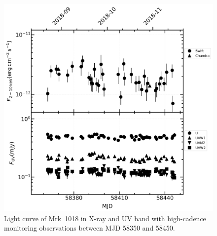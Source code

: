\documentclass[twocolumn]{aastex63}
\begin{document}

\begin{figure}
\centering
	\includegraphics[width=\textwidth]{./pic/subplots-xrt_uvot-radio-second-right-part.png}
    \caption{Light curve of Mrk~1018 in X-ray and UV band with high-cadence monitoring observations between MJD 58350 and 58450.}
    \label{fig:x-ray-uv-lc-rp-secondaxis}
\end{figure}
\end{document}
